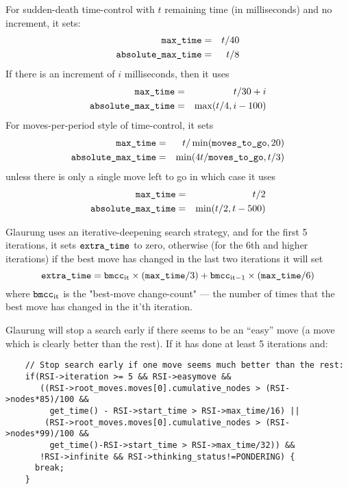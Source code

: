 \documentclass[10pt,dvipdfmx]{report}
\let\x=\times
\begin{document}
For sudden-death time-control with $t$ remaining time (in milliseconds)
and no increment, it sets:
\begin{eqnarray*}
\verb|max_time| &=& t/40 \\
\verb|absolute_max_time| &=& t/8
\end{eqnarray*}
If there is an increment of $i$ milliseconds, then it uses
\begin{eqnarray*}
\verb|max_time| &=& t/30+i \\
\verb|absolute_max_time| &=& \max(t/4,i-100)
\end{eqnarray*}
For moves-per-period style of time-control, it sets
\begin{eqnarray*}
\verb|max_time| &=& t/\min(\verb|moves_to_go|,20) \\
\verb|absolute_max_time| &=& \min(4t/\verb|moves_to_go|, t/3)
\end{eqnarray*}
unless there is only a single move left to go in which case it uses
\begin{eqnarray*}
\verb|max_time| &=& t/2 \\
\verb|absolute_max_time| &=& \min(t/2,t-500)
\end{eqnarray*}

Glaurung uses an iterative-deepening search strategy, and for
the first 5 iterations, it sets $\verb|extra_time|$ to zero,
otherwise (for the 6th and higher iterations) if the best move has changed
in the last two iterations it will set
\[ \verb|extra_time|
  = {\verb|bmcc|}_{\text{it}}\x(\verb|max_time|/3)
  + {\verb|bmcc|}_{\text{it}-1}\x(\verb|max_time|/6) \]
where ${\verb|bmcc|}_{\text{it}}$ is the "best-move change-count" --- the number
of times that the best move has changed in the $\text{it}$'th iteration.

Glaurung will stop a search early if there seems to be an ``easy'' move (a move
which is clearly better than the rest).  If it has done at least 5 iterations
and:
{\scriptsize
\begin{verbatim}
    // Stop search early if one move seems much better than the rest:
    if(RSI->iteration >= 5 && RSI->easymove &&
       ((RSI->root_moves.moves[0].cumulative_nodes > (RSI->nodes*85)/100 &&
         get_time() - RSI->start_time > RSI->max_time/16) ||
        (RSI->root_moves.moves[0].cumulative_nodes > (RSI->nodes*99)/100 && 
         get_time()-RSI->start_time > RSI->max_time/32)) &&
       !RSI->infinite && RSI->thinking_status!=PONDERING) {
      break;
    }
\end{verbatim}
}
\end{document}
